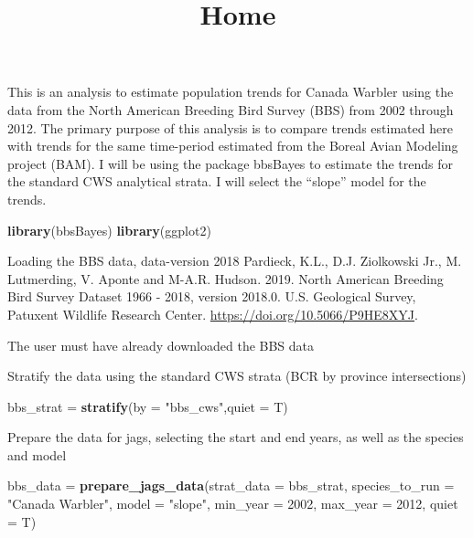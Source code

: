 \documentclass[]{article}
\title{Home}
\author{}
\date{}
\newenvironment{Shaded}{\begin{snugshade}}{\end{snugshade}}
\newcommand{\KeywordTok}[1]{\textcolor[rgb]{0.13,0.29,0.53}{\textbf{#1}}}
\newcommand{\DataTypeTok}[1]{\textcolor[rgb]{0.13,0.29,0.53}{#1}}
\newcommand{\DecValTok}[1]{\textcolor[rgb]{0.00,0.00,0.81}{#1}}
\newcommand{\StringTok}[1]{\textcolor[rgb]{0.31,0.60,0.02}{#1}}
\newcommand{\NormalTok}[1]{#1}
\begin{document}
\maketitle

This is an analysis to estimate population trends for Canada Warbler
using the data from the North American Breeding Bird Survey (BBS) from
2002 through 2012. The primary purpose of this analysis is to compare
trends estimated here with trends for the same time-period estimated
from the Boreal Avian Modeling project (BAM). I will be using the
package bbsBayes to estimate the trends for the standard CWS analytical
strata. I will select the ``slope'' model for the trends.

\begin{Shaded}
\begin{Highlighting}[]
\KeywordTok{library}\NormalTok{(bbsBayes)}
\KeywordTok{library}\NormalTok{(ggplot2)}
\end{Highlighting}
\end{Shaded}

Loading the BBS data, data-version 2018 Pardieck, K.L., D.J. Ziolkowski
Jr., M. Lutmerding, V. Aponte and M-A.R. Hudson. 2019. North American
Breeding Bird Survey Dataset 1966 - 2018, version 2018.0. U.S.
Geological Survey, Patuxent Wildlife Research Center.
\url{https://doi.org/10.5066/P9HE8XYJ}.

The user must have already downloaded the BBS data

Stratify the data using the standard CWS strata (BCR by province
intersections)

\begin{Shaded}
\begin{Highlighting}[]
\NormalTok{bbs_strat =}\StringTok{ }\KeywordTok{stratify}\NormalTok{(}\DataTypeTok{by =} \StringTok{"bbs_cws"}\NormalTok{,}\DataTypeTok{quiet =}\NormalTok{ T)}
\end{Highlighting}
\end{Shaded}

Prepare the data for jags, selecting the start and end years, as well as
the species and model

\begin{Shaded}
\begin{Highlighting}[]
\NormalTok{bbs_data =}\StringTok{ }\KeywordTok{prepare_jags_data}\NormalTok{(}\DataTypeTok{strat_data =}\NormalTok{ bbs_strat,}
                             \DataTypeTok{species_to_run =} \StringTok{"Canada Warbler"}\NormalTok{,}
                             \DataTypeTok{model =} \StringTok{"slope"}\NormalTok{,}
                             \DataTypeTok{min_year =} \DecValTok{2002}\NormalTok{,}
                             \DataTypeTok{max_year =} \DecValTok{2012}\NormalTok{,}
                             \DataTypeTok{quiet =}\NormalTok{ T)}
\end{Highlighting}
\end{Shaded}
\end{document}
